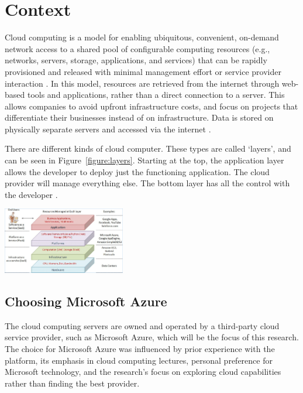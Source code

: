 \section{Context}

Cloud computing is a model for enabling ubiquitous, convenient,
on-demand network access to a shared pool of configurable computing resources
(e.g., networks, servers, storage, applications, and services)
that can be rapidly provisioned and released with minimal management effort or service provider interaction \cite{NIST2011}.
In this model, resources are retrieved from the internet through web-based tools and applications,
rather than a direct connection to a server.
This allows companies to avoid upfront infrastructure costs,
and focus on projects that differentiate their businesses instead of on infrastructure.
Data is stored on physically separate servers and accessed via the internet \cite{Zhang2010}.

There are different kinds of cloud computer.
These types are called `layers', and can be seen in Figure~\ref{figure:layers}.
Starting at the top, the application layer allows the developer to deploy just the functioning application.
The cloud provider will manage everything else.
The bottom layer has all the control with the developer \cite{Zhang2010}.

\begin{center}
    \includegraphics[width=0.4\textwidth]{./graphics/cloud-layers.png}
    \label{figure:layers}
\end{center}

\subsection{Choosing Microsoft Azure}

The cloud computing servers are owned and operated by a third-party cloud service provider,
such as Microsoft Azure, which will be the focus of this research.
The choice for Microsoft Azure was influenced by prior experience with the platform,
its emphasis in cloud computing lectures,
personal preference for Microsoft technology,
and the research's focus on exploring cloud capabilities rather than finding the best provider.


